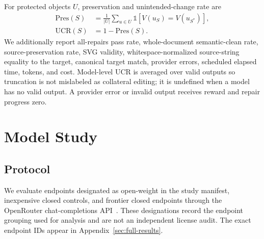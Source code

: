 \documentclass[11pt]{article}
\begin{document}
For protected objects $U$, preservation and unintended-change rate are
\[
  \begin{aligned}
  \mathrm{Pres}(S)&=\frac{1}{|U|}\sum_{u\in U}\mathbb{1}[V(u_S)=V(u_{S^*})],\\
  \mathrm{UCR}(S)&=1-\mathrm{Pres}(S).
  \end{aligned}
\]
We additionally report all-repairs pass rate, whole-document semantic-clean
rate, source-preservation rate, SVG validity, whitespace-normalized source-string
equality to the target, canonical target match, provider errors, scheduled
elapsed time, tokens, and cost.
Model-level UCR is averaged over valid outputs so truncation is not mislabeled
as collateral editing; it is undefined when a model has no valid output. A
provider error or invalid output receives reward and repair progress zero.

\begin{table}[t]
  \centering
  \small
  
  \caption{Top ten endpoints under binary specification reward. Full, Near,
  Repair, Progress, Clean, UCR, and Valid are percentages; UCR is conditional
  on valid outputs, and cost is provider-reported for all 40 tasks.
  Full results are in Appendix~\ref{sec:full-results}.}
  \label{tab:main}
\end{table}

\section{Model Study}
\label{sec:study}

\subsection{Protocol}

We evaluate \OpenModelCount{} endpoints designated as open-weight in the study
manifest, \ControlModelCount{} inexpensive closed controls, and
\FrontierModelCount{} frontier closed endpoints through the OpenRouter
chat-completions API~\citep{openrouter2026}. These designations record the
endpoint grouping used for analysis and are not an independent license audit.
The exact endpoint IDs appear in Appendix~\ref{sec:full-results}.
\end{document}
